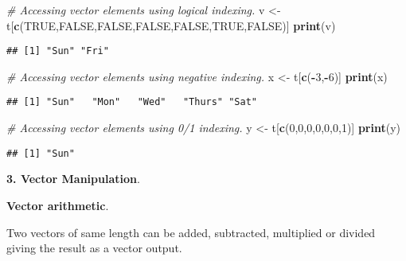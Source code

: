 \documentclass[
]{article}
\newenvironment{Shaded}{\begin{snugshade}}{\end{snugshade}}
\newcommand{\CommentTok}[1]{\textcolor[rgb]{0.56,0.35,0.01}{\textit{#1}}}
\newcommand{\ConstantTok}[1]{\textcolor[rgb]{0.56,0.35,0.01}{#1}}
\newcommand{\DecValTok}[1]{\textcolor[rgb]{0.00,0.00,0.81}{#1}}
\newcommand{\FunctionTok}[1]{\textcolor[rgb]{0.13,0.29,0.53}{\textbf{#1}}}
\newcommand{\NormalTok}[1]{#1}
\newcommand{\OtherTok}[1]{\textcolor[rgb]{0.56,0.35,0.01}{#1}}
\newcommand{\SpecialCharTok}[1]{\textcolor[rgb]{0.81,0.36,0.00}{\textbf{#1}}}
\begin{document}
\begin{Shaded}
\begin{Highlighting}[]
\CommentTok{\# Accessing vector elements using logical indexing.}
\NormalTok{v }\OtherTok{\textless{}{-}}\NormalTok{ t[}\FunctionTok{c}\NormalTok{(}\ConstantTok{TRUE}\NormalTok{,}\ConstantTok{FALSE}\NormalTok{,}\ConstantTok{FALSE}\NormalTok{,}\ConstantTok{FALSE}\NormalTok{,}\ConstantTok{FALSE}\NormalTok{,}\ConstantTok{TRUE}\NormalTok{,}\ConstantTok{FALSE}\NormalTok{)]}
\FunctionTok{print}\NormalTok{(v)}
\end{Highlighting}
\end{Shaded}

\begin{verbatim}
## [1] "Sun" "Fri"
\end{verbatim}

\begin{Shaded}
\begin{Highlighting}[]
\CommentTok{\# Accessing vector elements using negative indexing.}
\NormalTok{x }\OtherTok{\textless{}{-}}\NormalTok{ t[}\FunctionTok{c}\NormalTok{(}\SpecialCharTok{{-}}\DecValTok{3}\NormalTok{,}\SpecialCharTok{{-}}\DecValTok{6}\NormalTok{)]}
\FunctionTok{print}\NormalTok{(x)}
\end{Highlighting}
\end{Shaded}

\begin{verbatim}
## [1] "Sun"   "Mon"   "Wed"   "Thurs" "Sat"
\end{verbatim}

\begin{Shaded}
\begin{Highlighting}[]
\CommentTok{\# Accessing vector elements using 0/1 indexing.}
\NormalTok{y }\OtherTok{\textless{}{-}}\NormalTok{ t[}\FunctionTok{c}\NormalTok{(}\DecValTok{0}\NormalTok{,}\DecValTok{0}\NormalTok{,}\DecValTok{0}\NormalTok{,}\DecValTok{0}\NormalTok{,}\DecValTok{0}\NormalTok{,}\DecValTok{0}\NormalTok{,}\DecValTok{1}\NormalTok{)]}
\FunctionTok{print}\NormalTok{(y)}
\end{Highlighting}
\end{Shaded}

\begin{verbatim}
## [1] "Sun"
\end{verbatim}

\textbf{3. Vector Manipulation}.

\textbf{Vector arithmetic}.

Two vectors of same length can be added, subtracted, multiplied or
divided giving the result as a vector output.
\end{document}
